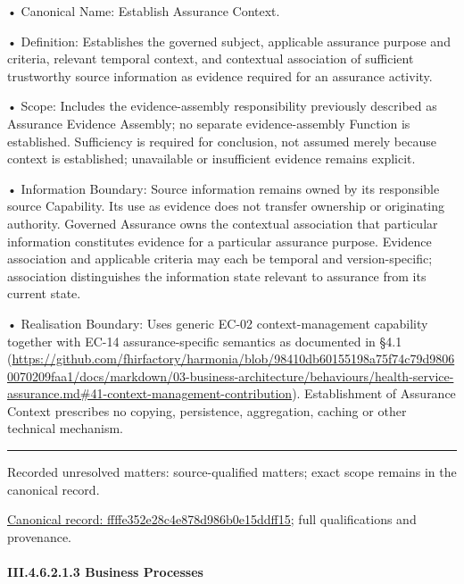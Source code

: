 •
Canonical Name: Establish Assurance Context.



•
Definition: Establishes the governed subject, applicable assurance purpose and criteria, relevant temporal context, and contextual association of sufficient trustworthy source information as evidence required for an assurance activity.



•
Scope: Includes the evidence-assembly responsibility previously described as Assurance Evidence Assembly; no separate evidence-assembly Function is established. Sufficiency is required for conclusion, not assumed merely because context is established; unavailable or insufficient evidence remains explicit.



•
Information Boundary: Source information remains owned by its responsible source Capability. Its use as evidence does not transfer ownership or originating authority. Governed Assurance owns the contextual association that particular information constitutes evidence for a particular assurance purpose. Evidence association and applicable criteria may each be temporal and version-specific; association distinguishes the information state relevant to assurance from its current state.



•
Realisation Boundary: Uses generic EC-02 context-management capability together with EC-14 assurance-specific semantics as documented in §4.1 (\url{https://github.com/fhirfactory/harmonia/blob/98410db60155198a75f74c79d98060070209faa1/docs/markdown/03-business-architecture/behaviours/health-service-assurance.md#41-context-management-contribution}). Establishment of Assurance Context prescribes no copying, persistence, aggregation, caching or other technical mechanism.



\medskip\hrule\medskip

{\small Recorded unresolved matters: source-qualified matters; exact scope remains in the canonical record.}\par
{\footnotesize \href{../../../../continuum/business/business-function/ffffe352e28c4e878d986b0e15ddff15.md}{Canonical record: ffffe352e28c4e878d986b0e15ddff15}; full qualifications and provenance.}\par
\paragraph*{III.4.6.2.1.3 Business Processes}
\label{navigation:III.4.6.2.1.3}


